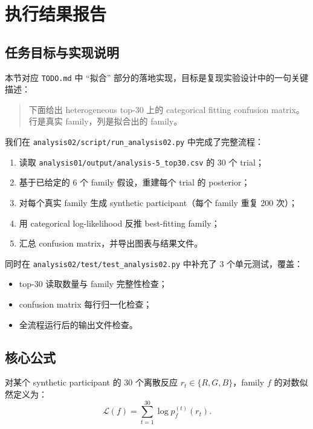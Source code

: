 \section{执行结果报告}

\subsection{任务目标与实现说明}

本节对应 \texttt{TODO.md} 中 ``拟合'' 部分的落地实现，目标是复现实验设计中的一句关键描述：

\begin{quote}
下面给出 heterogeneous top-30 上的 categorical fitting confusion matrix。行是真实 family，列是拟合出的 family。
\end{quote}

我们在 \texttt{analysis02/script/run\_analysis02.py} 中完成了完整流程：
\begin{enumerate}
    \item 读取 \texttt{analysis01/output/analysis-5\_top30.csv} 的 30 个 trial；
    \item 基于已给定的 6 个 family 假设，重建每个 trial 的 posterior；
    \item 对每个真实 family 生成 synthetic participant（每个 family 重复 200 次）；
    \item 用 categorical log-likelihood 反推 best-fitting family；
    \item 汇总 confusion matrix，并导出图表与结果文件。
\end{enumerate}

同时在 \texttt{analysis02/test/test\_analysis02.py} 中补充了 3 个单元测试，覆盖：
\begin{itemize}
    \item top-30 读取数量与 family 完整性检查；
    \item confusion matrix 每行归一化检查；
    \item 全流程运行后的输出文件检查。
\end{itemize}

\subsection{核心公式}

对某个 synthetic participant 的 30 个离散反应 \(r_t\in\{R,G,B\}\)，family \(f\) 的对数似然定义为：
\begin{equation}
\mathcal L(f)=\sum_{t=1}^{30}\log p_f^{(t)}(r_t).
\end{equation}

